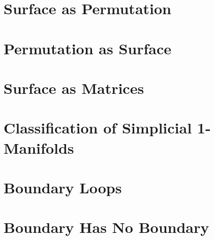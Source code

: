 \section{Surface as Permutation}

\section{Permutation as Surface}

\section{Surface as Matrices}

\section{Classiﬁcation of Simplicial 1-Manifolds}

\section{Boundary Loops}

\section{Boundary Has No Boundary}

